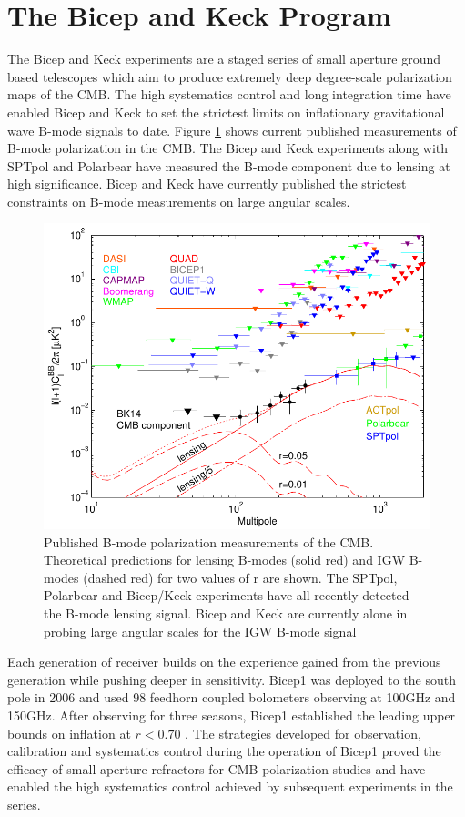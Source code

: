 \documentclass[12pt]{article}
\begin{document}
\section{The Bicep and Keck Program}
The Bicep and Keck experiments are a staged series of small aperture ground based
telescopes which aim to produce extremely deep degree-scale polarization maps
of the CMB. The high systematics control and long integration time have
enabled Bicep and Keck to set the strictest limits on inflationary
gravitational wave B-mode signals to date. Figure \ref{fig:BK_vs_world} shows
current published measurements of B-mode polarization in the CMB. The Bicep
and Keck experiments along with SPTpol and Polarbear have measured the B-mode
component due to lensing at high significance. Bicep and Keck have currently
published the strictest constraints on B-mode measurements on large angular
scales.

\begin{figure}
	\center
	\includegraphics[width=.6\textwidth]{bk14_vs_world.pdf}
	\caption{Published B-mode polarization measurements of the CMB.
	Theoretical predictions for lensing B-modes (solid red) and IGW B-modes
	(dashed red) for two values of r are shown. The SPTpol, Polarbear and
	Bicep/Keck experiments have all recently detected the B-mode lensing
	signal. Bicep and Keck are currently alone in probing large
	angular scales for the IGW B-mode signal}
	\label{fig:BK_vs_world}
\end{figure}


Each generation of receiver builds on the experience gained from
the previous generation while pushing deeper in sensitivity.
Bicep1 was deployed to the south pole in 2006 and used 98 feedhorn coupled
bolometers observing at 100GHz and 150GHz. After observing for three seasons,
Bicep1 established the leading  upper bounds on inflation at $r<0.70$
\cite{cite:Bicep1}. The strategies developed for observation, calibration and
systematics control during the operation of Bicep1 proved the efficacy of
small aperture refractors for CMB polarization studies and have enabled the
high systematics control achieved by subsequent experiments in the series.
\end{document}
